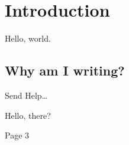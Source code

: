 \documentclass[ispdf]{usydthesis}
\begin{document}
\pagestyle{empty}
\tableofcontents

\pagestyle{empty}
\newpage
{}
{}
\listoffigures

\newpage
{}
{}
\pagestyle{empty}
\listoftables

\endgroup

\pagestyle{fancybook}
\cleardoublepage{}

\thispagestyle{fancybook}

\chapter{Introduction}

Hello, world.

\section{Why am I writing?}

Send Help\ldots

\newpage

Hello, there?

\newpage

Page 3
\end{document}
